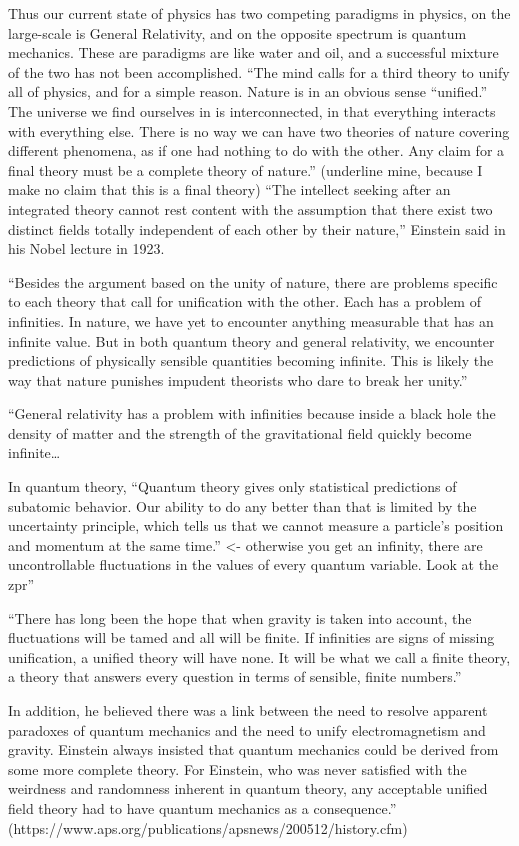 \documentclass {article}
\begin{document}
Thus our current state of physics has two competing paradigms in physics, on the large-scale is General Relativity, and on the opposite spectrum is quantum mechanics. These are paradigms are like water and oil, and a successful mixture of the two has not been accomplished. “The mind calls for a third theory to unify all of physics, and for a simple reason. Nature is in an obvious sense “unified.” The universe we find ourselves in is interconnected, in that everything interacts with everything else. There is no way we can have two theories of nature covering different phenomena, as if one had nothing to do with the other. Any claim for a final theory must be a complete theory of nature.” (underline mine, because I make no claim that this is a final theory) “The intellect seeking after an integrated theory cannot rest content with the assumption that there exist two distinct fields totally independent of each other by their nature,” Einstein said in his Nobel lecture in 1923.

“Besides the argument based on the unity of nature, there are problems specific to each theory that call for unification with the other. Each has a problem of infinities. In nature, we have yet to encounter anything measurable that has an infinite value. But in both quantum theory and general relativity, we encounter predictions of physically sensible quantities becoming infinite. This is likely the way that nature punishes impudent theorists who dare to break her unity.”

“General relativity has a problem with infinities because inside a black hole the density of matter and the strength of the gravitational field quickly become infinite… 

In quantum theory, “Quantum theory gives only statistical predictions of subatomic behavior. Our ability to do any better than that is limited by the uncertainty principle, which tells us that we cannot measure a particle’s position and momentum at the same time.” <- otherwise you get an infinity, there are uncontrollable fluctuations in the values of every quantum variable. Look at the zpr”  

“There has long been the hope that when gravity is taken into account, the fluctuations will be tamed and all will be finite. If infinities are signs of missing unification, a unified theory will have none. It will be what we call a finite theory, a theory that answers every question in terms of sensible, finite numbers.”

In addition, he believed there was a link between the need to resolve apparent paradoxes of quantum mechanics and the need to unify electromagnetism and gravity. Einstein always insisted that quantum mechanics could be derived from some more complete theory. For Einstein, who was never satisfied with the weirdness and randomness inherent in quantum theory, any acceptable unified field theory had to have quantum mechanics as a consequence.” (https://www.aps.org/publications/apsnews/200512/history.cfm)
\end{document}
